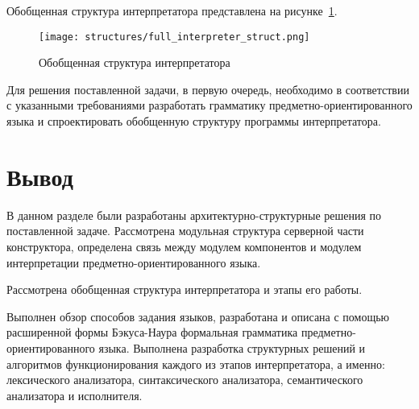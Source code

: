 Обобщенная структура интерпретатора представлена на рисунке~\ref{f:full_interpreter_struct}.

\begin{figure}[ht]
	\centering
	\vspace{\toppaddingoffigure}
	\texttt{[image: structures/full\_interpreter\_struct.png]}
	\caption{Обобщенная структура интерпретатора}
	\label{f:full_interpreter_struct}
\end{figure}

Для решения поставленной задачи, в первую очередь, необходимо в соответствии с указанными требованиями
разработать грамматику предметно-ориентированного языка и спроектировать обобщенную структуру программы интерпретатора.







\section*{Вывод}

В данном разделе были разработаны архитектурно-структурные решения по поставленной задаче.
Рассмотрена модульная структура серверной части конструктора,
определена связь между модулем компонентов и модулем интерпретации предметно-ориентированного языка.

Рассмотрена обобщенная структура интерпретатора и этапы его работы.

Выполнен обзор способов задания языков, разработана и описана с помощью расширенной формы Бэкуса-Наура формальная грамматика предметно-ориентированного языка.
Выполнена разработка структурных решений и алгоритмов функционирования каждого из этапов интерпретатора, а именно:
лексического анализатора, синтаксического анализатора, семантического анализатора и исполнителя.